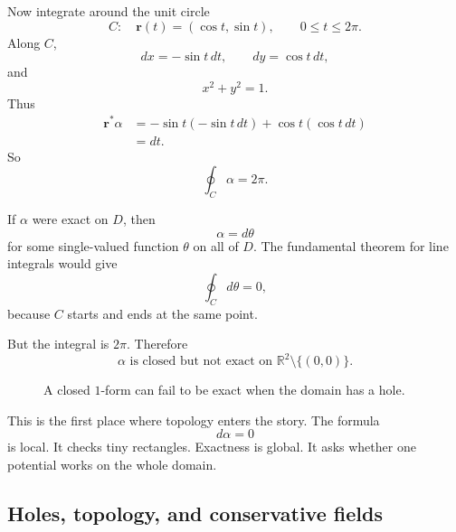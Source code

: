 Now integrate around the unit circle
\[
    C:\quad \mathbf r(t)=(\cos t,\sin t),
    \qquad 0\le t\le2\pi.
\]
Along \(C\),
\[
    dx=-\sin t\,dt,
    \qquad
    dy=\cos t\,dt,
\]
and
\[
    x^2+y^2=1.
\]
Thus
\[
\begin{aligned}
\mathbf r^*\alpha
&=
-\sin t(-\sin t\,dt)+\cos t(\cos t\,dt)\\
&=
dt.
\end{aligned}
\]
So
\[
\boxed{
    \oint_C\alpha=2\pi.
}
\]

If \(\alpha\) were exact on \(D\), then
\[
    \alpha=d\theta
\]
for some single-valued function \(\theta\) on all of \(D\).  The fundamental theorem for
line integrals would give
\[
    \oint_C d\theta=0,
\]
because \(C\) starts and ends at the same point.

But the integral is \(2\pi\).  Therefore
\[
\boxed{
    \alpha \text{ is closed but not exact on } \mathbb R^2\setminus\{(0,0)\}.
}
\]

\begin{figure}[h]
\centering
{}
\caption{A closed \(1\)-form can fail to be exact when the domain has a hole.}
\end{figure}

This is the first place where topology enters the story.  The formula
\[
    d\alpha=0
\]
is local.  It checks tiny rectangles.  Exactness is global.  It asks whether one
potential works on the whole domain.

\subsection{Holes, topology, and conservative fields}

